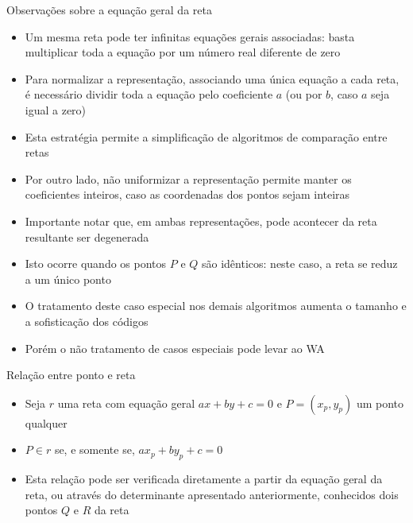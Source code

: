 \begin{frame}[fragile]{Observações sobre a equação geral da reta}

    \begin{itemize}
        \item Um mesma reta pode ter infinitas equações gerais associadas: basta multiplicar toda a equação por um número real diferente de zero
        \pause

        \item Para normalizar a representação, associando uma única equação a cada reta, é necessário dividir toda a equação pelo coeficiente $a$ (ou por $b$, caso $a$ seja igual a zero)
        \pause

        \item Esta estratégia permite a simplificação de algoritmos de comparação entre retas
        \pause

        \item Por outro lado, não uniformizar a representação permite manter os coeficientes 
            inteiros, caso as coordenadas dos pontos sejam inteiras
        \pause

        \item Importante notar que, em ambas representações, pode acontecer da reta resultante ser degenerada
        \pause

        \item Isto ocorre quando os pontos $P$ e $Q$ são idênticos: neste caso, a reta se reduz a um único ponto 
        \pause

        \item O tratamento deste caso especial nos demais algoritmos aumenta o tamanho e a sofisticação dos códigos
        \pause

        \item Porém o não tratamento de casos especiais pode levar ao WA
    \end{itemize}

\end{frame}

\begin{frame}[fragile]{Relação entre ponto e reta}

    \begin{itemize}
        \item Seja $r$ uma reta com equação geral $ax + by + c = 0$ e $P = (x_p, y_p)$ um ponto qualquer
        \pause

        \item $P\in r$ se, e somente se, $ax_p + by_p + c = 0$
        \pause


        \item Esta relação pode ser verificada diretamente a partir da equação geral da reta, ou através do determinante apresentado anteriormente, conhecidos dois pontos $Q$ e $R$ da reta
        \pause


    \end{itemize}

\end{frame}

